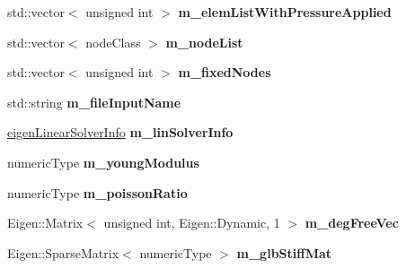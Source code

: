 \begin{DoxyCompactItemize}
std\+::vector$<$ unsigned int $>$ {\bfseries m\+\_\+elem\+List\+With\+Pressure\+Applied}
\item 
\mbox{\label{classbase_structural_analysis_class_a1007e2a6feb183e4f2aa79cc44eb9bd1}} 
std\+::vector$<$ node\+Class $>$ {\bfseries m\+\_\+node\+List}
\item 
\mbox{\label{classbase_structural_analysis_class_a7a950eab6be3c966121023a6a9797184}} 
std\+::vector$<$ unsigned int $>$ {\bfseries m\+\_\+fixed\+Nodes}
\item 
\mbox{\label{classbase_structural_analysis_class_af71b3fd8032c8ac1e177ae6b97a91d1c}} 
std\+::string {\bfseries m\+\_\+file\+Input\+Name}
\item 
\mbox{\label{classbase_structural_analysis_class_a610e3e0a3be5e5daa43615f21675b63c}} 
\mbox{\hyperlink{classeigen_linear_solver_info}{eigen\+Linear\+Solver\+Info}} {\bfseries m\+\_\+lin\+Solver\+Info}
\item 
\mbox{\label{classbase_structural_analysis_class_a06dce5c9f7beb2873fe6c00c66e985a7}} 
numeric\+Type {\bfseries m\+\_\+young\+Modulus}
\item 
\mbox{\label{classbase_structural_analysis_class_adacc82b7726291dd9a0a2441863858b4}} 
numeric\+Type {\bfseries m\+\_\+poisson\+Ratio}
\item 
\mbox{\label{classbase_structural_analysis_class_a30c9d240e183d6ed546127192b342086}} 
Eigen\+::\+Matrix$<$ unsigned int, Eigen\+::\+Dynamic, 1 $>$ {\bfseries m\+\_\+deg\+Free\+Vec}
\item 
\mbox{\label{classbase_structural_analysis_class_a32476178ae646ba8324440cc1d2efd11}} 
Eigen\+::\+Sparse\+Matrix$<$ numeric\+Type $>$ {\bfseries m\+\_\+glb\+Stiff\+Mat}
\item 
\mbox{\label{classbase_structural_analysis_class_a5b4cc2b24256ee92b746ef463f34d035}} 

\end{DoxyCompactItemize}
